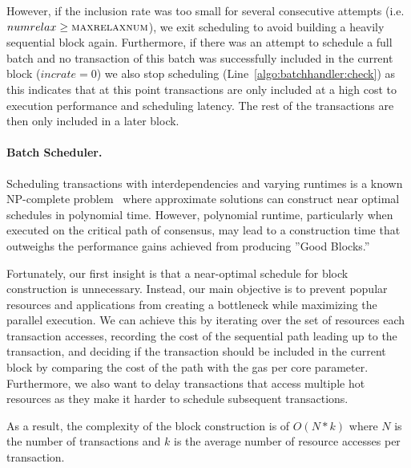 However, if the inclusion rate was too small for several consecutive attempts (i.e. $numrelax \geq \textsc{maxrelaxnum}$), we exit scheduling to avoid building a heavily sequential block again.
Furthermore, if there was an attempt to schedule a full batch and no transaction of this batch was successfully included in the current block ($incrate = 0$) we also stop scheduling (Line~\ref{algo:batchhandler:check}) as this indicates that at this point transactions are only included at a high cost to execution performance and scheduling latency. The rest of the transactions are then only included in a later block.%


\paragraph{Batch Scheduler.}

Scheduling transactions with interdependencies and varying runtimes is a known NP-complete problem~\cite{BAKER1996225} where approximate solutions can construct near optimal schedules in polynomial time. However, polynomial runtime, particularly when executed on the critical path of consensus, may lead to a construction time that outweighs the performance gains achieved from producing ''Good Blocks.''

Fortunately, our first insight is that a near-optimal schedule for block construction is unnecessary. Instead, our main objective is to prevent popular resources and applications from creating a bottleneck while maximizing the parallel execution. We can achieve this by iterating over the set of resources each transaction accesses, recording the cost of the sequential path leading up to the transaction, and deciding if the transaction should be included in the current block by comparing the cost of the path with the gas per core parameter.
Furthermore, we also want to delay transactions that access multiple hot resources as they make it harder to schedule subsequent transactions.

As a result, the complexity of the block construction is of $O(N*k)$ where $N$ is the number of transactions and $k$ is the average number of resource accesses per transaction.

